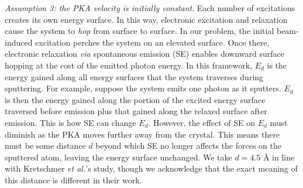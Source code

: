 \documentclass{article}
\begin{document}

\medskip\noindent
\textit{Assumption 3: the PKA velocity is initially constant}.
Each number of excitations creates its own energy surface.  In this way,
electronic excitation and relaxation cause the system to \textit{hop} from
surface to surface.  In our problem, the initial beam-induced excitation
perches the system on an elevated surface.  Once there, electronic relaxation
\textit{via} spontaneous emission (SE) enables downward surface hopping at the cost
of the emitted photon energy.
In this framework, $E_d$ is the energy gained along all energy surfaces
that the system traverses during sputtering.  For example, suppose the system
emits one photon as it sputters.  $E_d$ is then the energy gained along the
portion of the excited energy surface traversed before emission plus that
gained along the relaxed surface after emission.
This is how SE can change $E_d$.
However, the effect of SE on $E_d$ must diminish as the PKA moves further away
from the crystal.
This means there must be some distance $d$ beyond which SE no
longer affects the forces on the sputtered atom, leaving the energy surface
unchanged.
We take $d=4.5$ {\AA} in line with Kretschmer \textit{et al.}'s study, though we
acknowledge that the exact meaning of this distance is different in their work.
\cite{Kretschmer2020}
\end{document}
